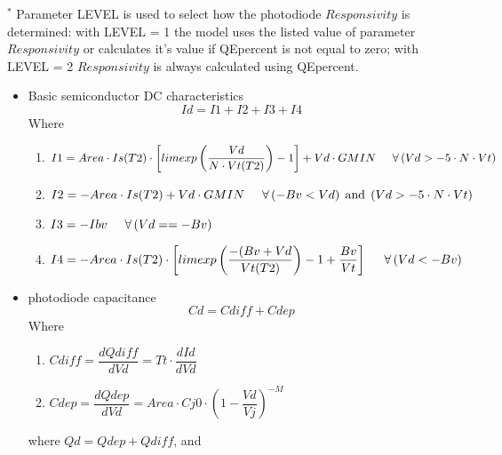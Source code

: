 \begin{scriptsize}
\begin{longtable}{ccllcc}
\end{longtable}
$^{*}$ Parameter LEVEL is used to select how the photodiode
$Responsivity$ is determined: with LEVEL = 1 the model uses the listed
value of parameter $Responsivity$ or calculates it's value if
QEpercent is not equal to zero; with LEVEL = 2 $Responsivity$ is
always calculated using QEpercent.

\end{scriptsize}

\begin{itemize}
 \item Basic semiconductor DC characteristics
    \begin{equation} 
     Id=I1+I2+I3+I4 
    \end{equation} 
    \hspace{3mm}Where
       \begin{enumerate}
       \item $I1 = Area \cdot Is(T2) \cdot \left[  limexp \left( \dfrac{Vd}{N \cdot Vt(T2)} \right)  - 1 \right]  + Vd \cdot GMIN  \hspace{5mm} \forall \left( Vd > -5 \cdot N \cdot Vt \right)  $
       \item $I2 = -Area \cdot Is(T2) + Vd \cdot GMIN \hspace{5mm} \forall\left( -Bv < Vd\right) \;\mathrm{and}\; \left( Vd > -5 \cdot N \cdot Vt \right) $
       \item $I3 = -Ibv \hspace{5mm} \forall\left(Vd == -Bv \right)  $
       \item $I4 = -Area \cdot Is(T2) \cdot \left[  limexp \left( \dfrac{-(Bv+Vd}{Vt(T2)} \right)  - 1 +\dfrac{Bv}{Vt} \right] \hspace{5mm} \forall \left( Vd < -Bv \right) $
       \end{enumerate}
 \item photodiode capacitance
    \begin{equation}
     Cd = Cdiff + Cdep
    \end{equation} 
    \hspace{3mm}Where
     \begin{enumerate}
      \item $Cdiff = \dfrac{dQdiff}{dVd}= Tt \cdot\dfrac{dId}{dVd}$
      \item $Cdep = \dfrac{dQdep}{dVd}=Area \cdot Cj0 \cdot \left( 1-\dfrac{Vd}{Vj} \right) ^{-M}$
     \end{enumerate}
     \hspace{3mm} where
     $Qd = Qdep + Qdiff$, and



\end{itemize}
